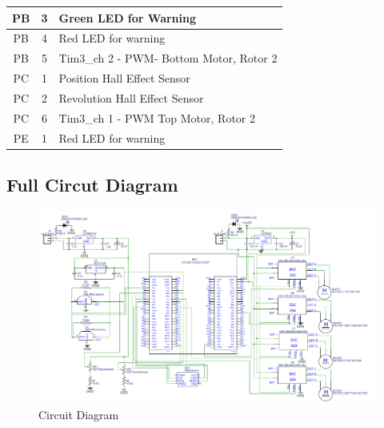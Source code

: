 \begin{table}[H]
\begin{tabular}{|c|c|l|}
    PB                                   & 3                                   & Green   LED for Warning                                                               \\ \hline
    PB                                   & 4                                   & Red LED for warning                                                                   \\ \hline
    PB                                   & 5                                   & Tim3\_ch 2 - PWM- Bottom Motor,   Rotor 2                                             \\ \hline
    PC                                   & 1                                   & Position Hall Effect Sensor                                                           \\ \hline
    PC                                   & 2                                   & Revolution Hall Effect Sensor                                                         \\ \hline
    PC                                   & 6                                   & Tim3\_ch 1 - PWM Top Motor, Rotor 2                                                   \\ \hline
    PE                                   & 1                                   & Red LED for warning                                                                   \\ \hline
    \end{tabular}
    \end{table}
\normalsize
\begin{landscape}
    \section{Full Circut Diagram}
    \begin{figure} [H]               
        \centering
        \includegraphics*[width = 0.9 \linewidth]{figs/Design/Final Design/Electronics/Circuit_Design.png}
        \caption{Circuit Diagram}
        \label{fig: circuit_diagram}
    \end{figure} 
\end{landscape}
